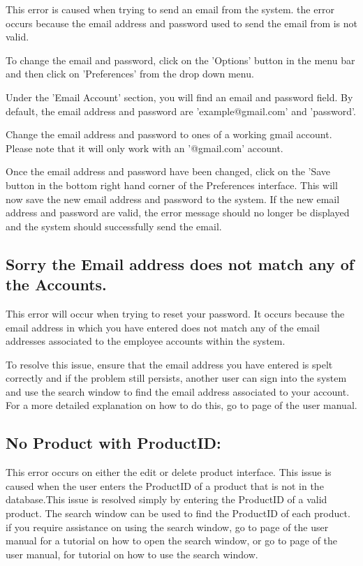 This error is caused when trying to send an email from the system. the error occurs because the email address and password used to send the email from is not valid.

To change the email and password, click on the 'Options' button in the menu bar and then click on 'Preferences' from the drop down menu.

Under the 'Email Account' section, you will find an email and password field. By default, the email address and password are 'example@gmail.com' and 'password'.

Change the email address and password to ones of a working gmail account. Please note that it will only work with an '@gmail.com' account.

Once the email address and password have been changed, click on the 'Save button in the bottom right hand corner of the Preferences interface. This will now save the new email address and password to the system. If the new email address and password are valid, the error message should no longer be displayed and the system should successfully send the email.

\subsection{Sorry the Email address does not match any of the Accounts.}

This error will occur when trying to reset your password. It occurs because the email address in which you have entered does not match any of the email addresses associated to the employee accounts within the system.

To resolve this issue, ensure that the email address you have entered is spelt correctly and if the problem still persists, another user can sign into the system and use the search window to find the email address associated to your account. For a more detailed explanation on how to do this, go to page \pageref{fig:Using the search window} of the user manual.

\subsection{No Product with ProductID:}

This error occurs on either the edit or delete product interface. This issue is caused when the user enters the ProductID of a product that is not in the database.This issue is resolved simply by entering the ProductID of a valid product. The search window can be used to find the ProductID of each product. if you require assistance on using the search window, go to page \pageref{fig:Accessing the search window} of the user manual for a tutorial on how to open the search window, or go to page \pageref{fig:Using the search window}of the user manual, for tutorial on how to use the search window.

